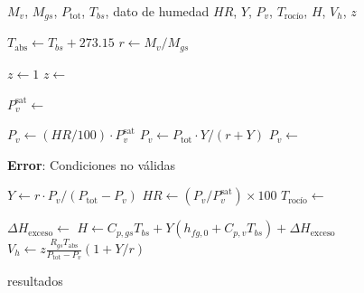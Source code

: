 
\begin{algorithm}[H]
\caption{Cálculo de Propiedades Psicrométricas}
\label{alg:main}
\begin{algorithmic}[1]
\Require $M_v$, $M_{gs}$, $P_{\text{tot}}$, $T_{bs}$, dato de humedad
\Ensure $HR$, $Y$, $P_v$, $T_{\text{rocío}}$, $H$, $V_h$, $z$

\State $T_{\text{abs}} \gets T_{bs} + 273.15$
\State $r \gets M_v / M_{gs}$

\State
{}
    \State $z \gets 1$
\Else
    \State $z \gets$ 
\EndIf

\State
{}
\State $P_v^{\text{sat}} \gets$ 

\State
{}
    \State $P_v \gets (HR/100) \cdot P_v^{\text{sat}}$
    \State $P_v \gets P_{\text{tot}} \cdot Y/(r + Y)$
    \State $P_v \gets$ 
\EndIf

\State
{}
    \State \textbf{Error}: Condiciones no válidas
\EndIf

\State
{}
\State $Y \gets r \cdot P_v / (P_{\text{tot}} - P_v)$
\State $HR \gets (P_v / P_v^{\text{sat}}) \times 100$
\State $T_{\text{rocío}} \gets$ 

\State
{}
\State $\Delta H_{\text{exceso}} \gets$ 
\State $H \gets C_{p,gs} T_{bs} + Y(h_{fg,0} + C_{p,v} T_{bs}) + \Delta H_{\text{exceso}}$
\State $V_h \gets z \frac{R_{gs} T_{\text{abs}}}{P_{\text{tot}} - P_v}(1 + Y/r)$

\State
\State \Return resultados
\end{algorithmic}
\end{algorithm}
